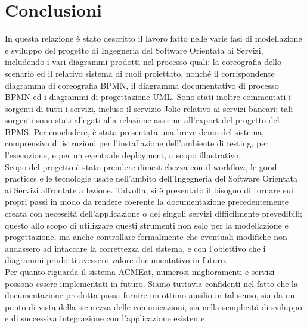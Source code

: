 \documentclass[11pt]{article} %
\begin{document}
\clearpage

\section{Conclusioni}

In questa relazione è stato descritto il lavoro fatto nelle varie fasi di modellazione e sviluppo del progetto di Ingegneria del Software Orientata ai Servizi, includendo i vari diagrammi prodotti nel processo quali: la coreografia dello scenario ed il relativo sistema di ruoli proiettato, nonché il corrispondente diagramma di coreografia BPMN, il diagramma documentativo di processo BPMN ed i diagrammi di progettazione UML. Sono stati inoltre commentati i sorgenti di tutti i servizi, incluso il servizio Jolie relativo ai servizi bancari; tali sorgenti sono stati allegati alla relazione assieme all'export del progetto del BPMS. Per concludere, è stata presentata una breve demo del sistema, comprensiva di istruzioni per l'installazione dell'ambiente di testing, per l'esecuzione, e per un eventuale deployment, a scopo illustrativo.\\
Scopo del progetto è stato prendere dimestichezza con il workflow, le good practices e le tecnologie usate nell'ambito dell'Ingegneria del Software Orientata ai Servizi affrontate a lezione. Talvolta, si è presentato il bisogno di tornare sui propri passi in modo da rendere coerente la documentazione precedentemente creata con necessità dell'applicazione o dei singoli servizi difficilmente prevedibili; questo allo scopo di utilizzare questi strumenti non solo per la modellazione e progettazione, ma anche controllare formalmente che eventuali modifiche non andassero ad intaccare la correttezza del sistema, e con l'obiettivo che i diagrammi prodotti avessero valore documentativo in futuro. \\
Per quanto riguarda il sistema ACMEat, numerosi miglioramenti e servizi possono essere implementati in futuro. Siamo tuttavia confidenti nel fatto che la documentazione prodotta possa fornire un ottimo ausilio in tal senso, sia da un punto di vista della sicurezza delle comunicazioni, sia nella semplicità di sviluppo e di successiva integrazione con l'applicazione esistente.
\end{document}
